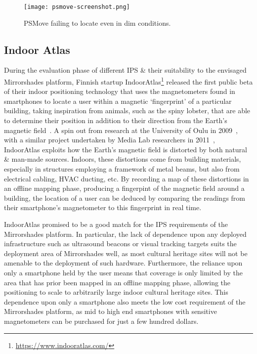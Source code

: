 \begin{figure}[h]
	\begin{center}
		\texttt{[image: psmove-screenshot.png]}
		\caption{PSMove failing to locate even in dim conditions.}
		\label{psmove-screenshot.png}
	\end{center}
\end{figure}


\subsection{Indoor Atlas}

During the evaluation phase of different IPS \& their suitability to the envisaged Mirrorshades platform, Finnish startup IndoorAtlas\footnote{\url{https://www.indooratlas.com/}} released the first public beta of their indoor positioning technology that uses the magnetometers found in smartphones to locate a user within a magnetic `fingerprint' of a particular building, taking inspiration from animals, such as the spiny lobster, that are able to determine their position in addition to their direction from the Earth's magnetic field~\cite{Boles2003}. A spin out from research at the University of Oulu in 2009~\cite{Haverinen2009,Haverinen2009a}, with a similar project undertaken by Media Lab researchers in 2011~\cite{Chung2011}, IndoorAtlas exploits how the Earth's magnetic field is distorted by both natural \& man-made sources. Indoors, these distortions come from building materials, especially in structures employing a framework of metal beams, but also from electrical cabling, HVAC ducting, etc. By recording a map of these distortions in an offline mapping phase, producing a fingerpint of the magnetic field around a building, the location of a user can be deduced by comparing the readings from their smartphone's magnetometer to this fingerprint in real time.

IndoorAtlas promised to be a good match for the IPS requirements of the Mirrorshades platform. In particular, the lack of dependence upon any deployed infrastructure such as ultrasound beacons or visual tracking targets suits the deployment area of Mirrorshades well, as most cultural heritage sites will not be amenable to the deployment of such hardware. Furthermore, the reliance upon only a smartphone held by the user means that coverage is only limited by the area that has prior been mapped in an offline mapping phase, allowing the positioning to scale to arbitrarily large indoor cultural heritage sites. This dependence upon only a smartphone also meets the low cost requirement of the Mirrorshades platform, as mid to high end smartphones with sensitive magnetometers can be purchased for just a few hundred dollars.

